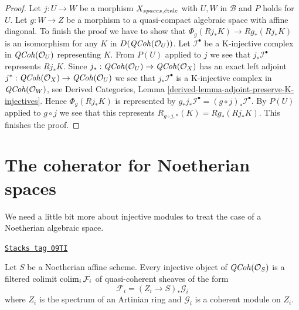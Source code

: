 \begin{proof}
\medskip\noindent
Let $j : U \to W$ be a morphism $X_{spaces, \acute{e}\text{tale}}$ with
$U, W$ in $\mathcal{B}$ and $P$ holds for $U$. Let $g : W \to Z$
be a morphism to a quasi-compact algebraic space with affine diagonal.
To finish the proof we have to show that
$\Phi_g(Rj_*K) \to Rg_*(Rj_*K)$
is an isomorphism for any $K$ in $D(\mathit{QCoh}(\mathcal{O}_U))$.
Let $\mathcal{I}^\bullet$ be a K-injective complex in $\mathit{QCoh}(\mathcal{O}_U)$
representing $K$.
From $P(U)$ applied to $j$ we see that
$j_*\mathcal{I}^\bullet$ represents $Rj_*K$.
Since $j_* : \mathit{QCoh}(\mathcal{O}_U) \to \mathit{QCoh}(\mathcal{O}_X)$
has an exact left adjoint
$j^* : \mathit{QCoh}(\mathcal{O}_X) \to \mathit{QCoh}(\mathcal{O}_U)$
we see that $j_*\mathcal{I}^\bullet$ is a K-injective complex
in $\mathit{QCoh}(\mathcal{O}_W)$, see
Derived Categories, Lemma \ref{derived-lemma-adjoint-preserve-K-injectives}.
Hence $\Phi_g(Rj_*K)$ is represented by
$g_*j_*\mathcal{I}^\bullet = (g \circ j)_*\mathcal{I}^\bullet$.
By $P(U)$ applied to $g \circ j$ we see that this represents
$R_{g \circ j, *}(K) = Rg_*(Rj_*K)$. This finishes the proof.
\end{proof}

\section{The coherator for Noetherian spaces}
\label{spaces-perfect-section-coherator-Noetherian}
We need a little bit more about injective modules to treat the case
of a Noetherian algebraic space.

\begin{lemma}
\label{spaces-perfect-lemma-affine-injective-colimit-direct-sum-pushforwards-artin}
\href{https://stacks.math.columbia.edu/tag/09TI}{\texttt{Stacks tag 09TI}}

Let $S$ be a Noetherian affine scheme. Every injective object of
$\mathit{QCoh}(\mathcal{O}_S)$ is a filtered colimit $\operatorname{colim}_i \mathcal{F}_i$
of quasi-coherent sheaves of the form
$$
\mathcal{F}_i = (Z_i \to S)_*\mathcal{G}_i
$$
where $Z_i$ is the spectrum of an Artinian ring and $\mathcal{G}_i$
is a coherent module on $Z_i$.
\end{lemma}

